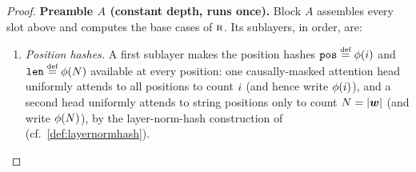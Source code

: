 \documentclass{article}
\begin{document}
\begin{proof}
    \textbf{Preamble $A$ (constant depth, runs once).}
    Block $A$ assembles every slot above and computes the base cases of ${\textsc{r}}$.
    Its sublayers, in order, are:
    \begin{enumerate}[noitemsep,topsep=0pt,leftmargin=18pt,parsep=0pt]
        \item \emph{Position hashes.} A first sublayer makes the position hashes $\fpos \defeq \phi(\idxi)$ and $\fpaddinglen \defeq \phi(\idxn)$ available at every position: one causally-masked attention head uniformly attends to all positions to count ${{ i}}$ (and hence write $\phi({{ i}})$), and a second head uniformly attends to string positions only to count ${{ N}} = |{{\boldsymbol{w}}}|$ (and write $\phi({{ N}})$), by the layer-norm-hash construction of \citet[Lem.~1]{merrill-2025littledepthgoeslong} (cf.\ \cref{def:layernormhash}).


\end{enumerate}
\end{proof}
\end{document}
